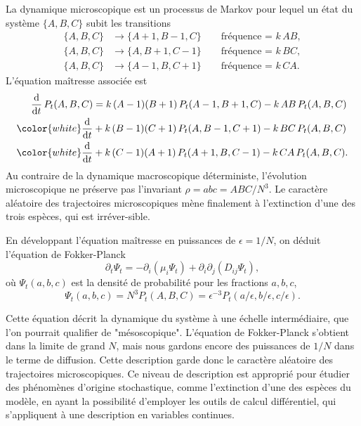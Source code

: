 \documentclass[openany,a4paper,12pt]{article}
\begin{document}
\par La dynamique microscopique est un processus de Markov pour lequel un état du système $\{A,B,C\}$ subit les transitions 
%
\begin{equation}\label{dyn_micro}
\begin{split}
	\{A,B,C\} &\longrightarrow \{A+1,B-1,C\}  \qquad \text{fréquence = } k\, AB, \\
	\{A,B,C\} &\longrightarrow \{A,B+1,C-1\}  \qquad \text{fréquence = } k\, BC, \\
	\{A,B,C\} &\longrightarrow \{A-1,B,C+1\}  \qquad \text{fréquence = } k\, CA.
\end{split}
\end{equation}
%
L'équation maîtresse associée est 
%
\begin{equation}\label{eq_maitresse}
\begin{split}
	\frac{\dd}{\dd t}\, P_t(A,B,C) 
	&= k\, (A-1)(B+1)\, P_t(A-1,B+1,C) - k\, AB\, P_t(A,B,C) \\
	{\color{white}\frac{\dd}{\dd t}} %
	&+ k\, (B-1)(C+1)\, P_t(A,B-1,C+1) - k\, BC\, P_t(A,B,C) \\
	{\color{white}\frac{\dd}{\dd t}} %
	&+ k\, (C-1)(A+1)\, P_t(A+1,B,C-1) - k\, CA\, P_t(A,B,C).
\end{split}
\end{equation}
% 
Au contraire de la dynamique macroscopique déterministe, l'évolution microscopique ne préserve pas l'invariant $\rho = abc = ABC/N^3$. Le caractère aléatoire des trajectoires microscopiques mène finalement à l'extinction d'une des trois espèces, qui est irréver-sible. 

\par En développant l'équation maîtresse en puissances de $\epsilon = 1/N$, on déduit l'équation de Fokker-Planck 
%
\begin{equation}\label{eq_FP}
	\partial_t \Psi_t = - \partial_i ( \mu_i \Psi_t ) + \partial_i\partial_j (D_{ij} \Psi_t),
\end{equation}
%
où $\Psi_t(a,b,c)$ est la densité de probabilité pour les fractions $a,b,c$,
%
\begin{equation}\label{lien_psi_proba}
	\Psi_t(a,b,c) = N^3 P_t(A,B,C) = \epsilon^{-3} P_t(a/\epsilon, b/\epsilon, c/\epsilon).
\end{equation}

\par Cette équation décrit la dynamique du système à une échelle intermédiaire, que l'on pourrait qualifier de "mésoscopique". L'équation de Fokker-Planck s'obtient dans la limite de grand $N$, mais nous gardons encore des puissances de $1/N$ dans le terme de diffusion. Cette description garde donc le caractère aléatoire des trajectoires microscopiques. Ce niveau de description est approprié pour étudier des phénomènes d'origine stochastique, comme l'extinction d'une des espèces du modèle, en ayant la possibilité d'employer les outils de calcul différentiel, qui s'appliquent à une description en variables continues. 
\end{document}
